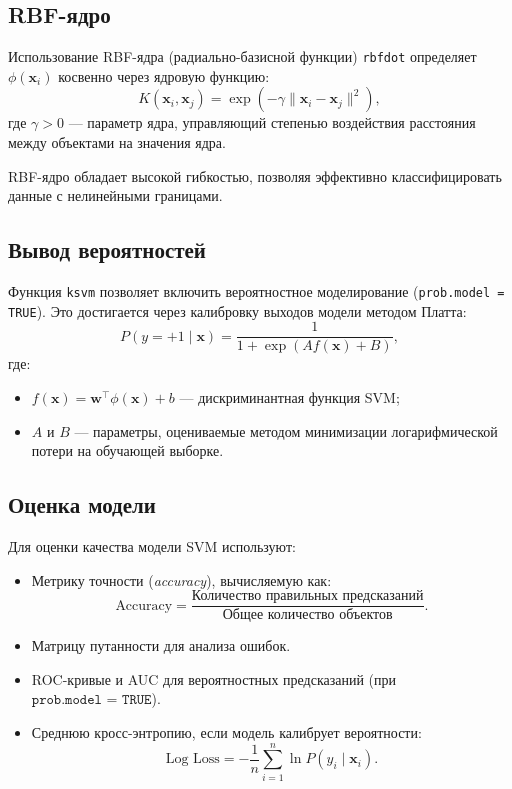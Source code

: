 \subsection{RBF-ядро}
Использование RBF-ядра (радиально-базисной функции) \texttt{rbfdot} определяет \(\phi(\mathbf{x}_i)\) косвенно через ядровую функцию:
\[
K(\mathbf{x}_i, \mathbf{x}_j) = \exp\left(-\gamma \|\mathbf{x}_i - \mathbf{x}_j\|^2\right),
\]
где \(\gamma > 0\) — параметр ядра, управляющий степенью воздействия расстояния между объектами на значения ядра.

RBF-ядро обладает высокой гибкостью, позволяя эффективно классифицировать данные с нелинейными границами.

\subsection{Вывод вероятностей}
Функция \texttt{ksvm} позволяет включить вероятностное моделирование (\texttt{prob.model = TRUE}). Это достигается через калибровку выходов модели методом Платта:
\[
P(y = +1 \mid \mathbf{x}) = \frac{1}{1 + \exp(A f(\mathbf{x}) + B)},
\]
где:
\begin{itemize}
	\item \( f(\mathbf{x}) = \mathbf{w}^\top \phi(\mathbf{x}) + b \) — дискриминантная функция SVM;
	\item \( A \) и \( B \) — параметры, оцениваемые методом минимизации логарифмической потери на обучающей выборке.
\end{itemize}

\subsection{Оценка модели}
Для оценки качества модели SVM используют:
\begin{itemize}
	\item Метрику точности (\textit{accuracy}), вычисляемую как:
	\[
	\text{Accuracy} = \frac{\text{Количество правильных предсказаний}}{\text{Общее количество объектов}}.
	\]
	\item Матрицу путанности для анализа ошибок.
	\item ROC-кривые и AUC для вероятностных предсказаний (при \( \texttt{prob.model = TRUE} \)).
	\item Среднюю кросс-энтропию, если модель калибрует вероятности:
	\[
	\text{Log Loss} = -\frac{1}{n} \sum_{i=1}^n \ln P(y_i \mid \mathbf{x}_i).
	\]
\end{itemize}

